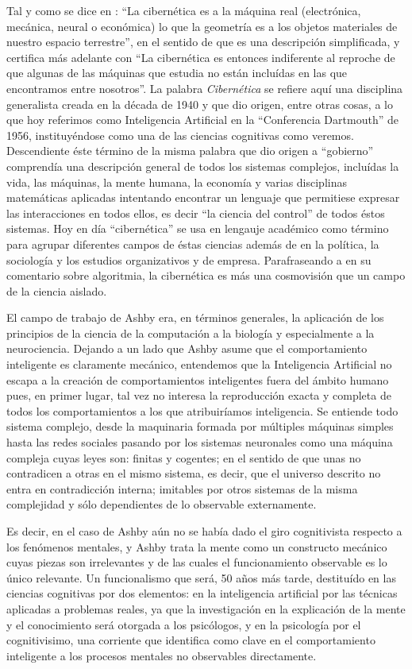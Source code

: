 \documentclass[12pt]{memoir}
\begin{document}
Tal y como se dice en \cite{ciberneticsAshby}: ``La cibernética es a la máquina real (electrónica, mecánica, neural o económica) lo que la geometría es a los objetos materiales de nuestro espacio terrestre'', en el sentido de que es una descripción simplificada, y certifica más adelante con ``La cibernética es entonces indiferente al reproche de que algunas de las máquinas que estudia no están incluídas en las que encontramos entre nosotros''. La palabra \textit{Cibernética} se refiere aquí una disciplina generalista creada en la década de 1940 y que dio origen, entre otras cosas, a lo que hoy referimos como Inteligencia Artificial en la ``Conferencia Dartmouth'' de 1956, instituyéndose como una de las ciencias cognitivas como veremos. Descendiente éste término de la misma palabra que dio origen a ``gobierno'' comprendía una descripción general de todos los sistemas complejos, incluídas la vida, las máquinas, la mente humana, la economía y varias disciplinas matemáticas aplicadas intentando encontrar un lenguaje que permitiese expresar las interacciones en todos ellos, es decir ``la ciencia del control'' de todos éstos sistemas. Hoy en día ``cibernética'' se usa en lengauje académico como término para agrupar diferentes campos de éstas ciencias además de en la política, la sociología y los estudios organizativos y de empresa. Parafraseando a \cite{pylyshyn70} en su comentario sobre algoritmia, la cibernética es más una cosmovisión que un campo de la ciencia aislado.

El campo de trabajo de Ashby era, en términos generales, la aplicación de los principios de la ciencia de la computación a la biología y especialmente a la neurociencia. Dejando a un lado que Ashby asume que el comportamiento inteligente es claramente mecánico, entendemos que la Inteligencia Artificial no escapa a la creación de comportamientos inteligentes fuera del ámbito humano pues, en primer lugar, tal vez no interesa la reproducción exacta y completa de todos los comportamientos a los que atribuiríamos inteligencia. Se entiende todo sistema complejo, desde la maquinaria formada por múltiples máquinas simples hasta las redes sociales pasando por los sistemas neuronales como una máquina compleja cuyas leyes son: finitas y cogentes; en el sentido de que unas no contradicen a otras en el mismo sistema, es decir, que el universo descrito no entra en contradicción interna; imitables por otros sistemas de la misma complejidad y sólo dependientes de lo observable externamente.
 
Es decir, en el caso de Ashby aún no se había dado el giro cognitivista respecto a los fenómenos mentales, y Ashby trata la mente como un constructo mecánico cuyas piezas son irrelevantes y de las cuales el funcionamiento observable es lo único relevante. Un funcionalismo que será, 50 años más tarde, destituído en las ciencias cognitivas por dos elementos: en la inteligencia artificial por las técnicas aplicadas a problemas reales, ya que la investigación en la explicación de la mente y el conocimiento será otorgada a los psicólogos, y en la psicología por el cognitivisimo, una corriente que identifica como clave en el comportamiento inteligente a los procesos mentales no observables directamente. 
\end{document}
